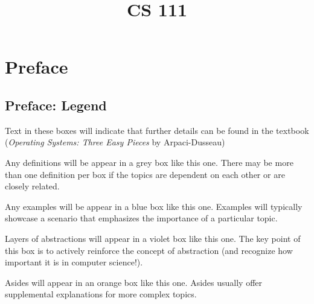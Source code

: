 \documentclass{report}
\title{CS 111}
\date{}
\begin{document}
\maketitle

\tableofcontents
\newpage

\part*{Preface}










\chapter*{Preface: Legend}
\begin{tcolorbox}[colback=black!5!white,colframe=black!75!black,title=\textit{Operating Systems, Three Easy Pieces}]
  Text in these boxes will indicate that further details can be found in the textbook
  (\textit{Operating Systems: Three Easy Pieces} by Arpaci-Dusseau)
\end{tcolorbox}

\begin{tcolorbox}[title=Definitions]
  Any definitions will be appear in a grey box like this one. There may be more than one definition
  per box if the topics are dependent on each other or are closely related.
\end{tcolorbox}

\begin{tcolorbox}[colback=blue!5!white,colframe=black!75!blue,title=Examples]
  Any examples will be appear in a blue box like this one. Examples will typically showcase a scenario
  that emphasizes the importance of a particular topic.
\end{tcolorbox}

\begin{tcolorbox}[colback=violet!5!white,colframe=violet,title=Abstractions] 
  Layers of abstractions will appear in a violet box like this one. The key point of this box is to
  actively reinforce the concept of abstraction (and recognize how important it is in computer science!).
\end{tcolorbox}

\begin{tcolorbox}[colback=orange!5!white,colframe=black!75!orange,title=Asides]
  Asides will appear in an orange box like this one. Asides usually offer supplemental explanations
  for more complex topics.
\end{tcolorbox}
\end{document}
